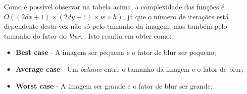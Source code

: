     \par Como é possível observar na tabela acima, a complexidade das funções é $O((2dx + 1) \times (2dy + 1) \times w \times h)$, já que o número de iterações está dependente desta vez não só pelo tamanho da imagem, mas também pelo tamanho do fator do \textit{blur}. \ Isto resulta em obter como:

    \begin{itemize}
        \item \textbf{Best case} - A imagem ser pequena e o fator de blur ser pequeno;
        \item \textbf{Average case} - Um \textit{balance} entre o tamanho da imagem e o fator de blur;
        \item \textbf{Worst case} - A imagem ser grande e o fator de blur ser grande.
    \end{itemize}
